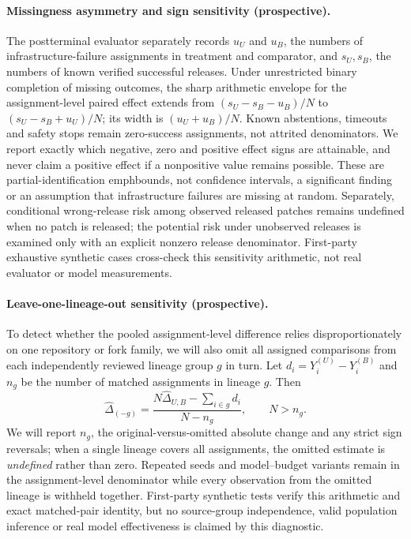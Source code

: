 \documentclass[pdflatex,sn-basic]{sn-jnl}
\begin{document}
\paragraph{Missingness asymmetry and sign sensitivity (prospective).}
The postterminal evaluator separately records $u_U$ and $u_B$,
the numbers of infrastructure-failure assignments in treatment
and comparator, and $s_U,s_B$, the numbers of known verified
successful releases. Under unrestricted binary completion
of missing outcomes, the sharp arithmetic envelope for the
assignment-level paired effect extends from
$(s_U-s_B-u_B)/N$ to $(s_U-s_B+u_U)/N$;
its width is $(u_U+u_B)/N$. Known abstentions, timeouts
and safety stops remain zero-success assignments, not
attrited denominators. We report exactly which negative,
zero and positive effect signs are attainable, and never
claim a positive effect if a nonpositive value remains
possible. These are partial-identification emph{bounds},
not confidence intervals, a significant finding or
an assumption that infrastructure failures are missing at
random. Separately, conditional wrong-release risk among
observed released patches remains undefined when no
patch is released; the potential risk under unobserved
releases is examined only with an explicit nonzero
release denominator. First-party exhaustive synthetic
cases cross-check this sensitivity arithmetic, not
real evaluator or model measurements.

\paragraph{Leave-one-lineage-out sensitivity (prospective).}
To detect whether the pooled assignment-level difference
relies disproportionately on one repository or fork family,
we will also omit all assigned comparisons from each
independently reviewed lineage group $g$ in turn.
Let $d_i=Y_i^{(U)}-Y_i^{(B)}$ and $n_g$ be the
number of matched assignments in lineage $g$. Then
\begin{equation}
\widehat{\Delta}_{(-g)}
=\frac{N\widehat{\Delta}_{U,B}
-\sum_{i\in g}d_i}{N-n_g},\qquad N>n_g.
\label{eq:lineage-omission}
\end{equation}
We will report $n_g$, the original-versus-omitted
absolute change and any strict sign reversals; when a
single lineage covers all assignments, the omitted estimate
is \emph{undefined} rather than zero. Repeated seeds and
model--budget variants remain in the assignment-level
denominator while every observation from the omitted lineage
is withheld together. First-party synthetic tests verify
this arithmetic and exact matched-pair identity, but no
source-group independence, valid population inference or
real model effectiveness is claimed by this diagnostic.
\end{document}
